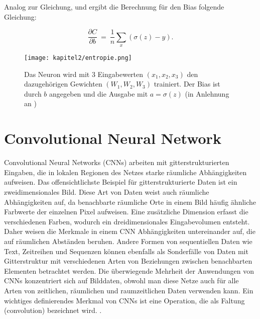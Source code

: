     Analog zur Gleichung\label{Formel2_9}, \label{Formel2_10} und \label{Formel2_11} ergibt die Berechnung für den Bias folgende Gleichung:

    \begin{equation}
        \frac{\partial C}{\partial b} \ =\ \frac{1}{n}\sum _{x}( \sigma ( z) -y).
    \end{equation}

    \begin{figure}[H]
        \centering
        \texttt{[image: kapitel2/entropie.png]}
        \caption[Darstellung der Kreuzentropie am beispiel eines Neurons]{Das Neuron wird mit 3 Eingabewerten $(x_1, x_2, x_3)$ den dazugehörigen Gewichten $(W_1, W_2, W_3)$ trainiert. Der Bias ist durch $b$ angegeben und die Ausgabe mit $a = \sigma(z)$ (in Anlehnung an \cite*{Nielsen2015})}
        \label{Kap2:Entropie}
    \end{figure}

    \section{Convolutional Neural Network}
    Convolutional Neural Networks (CNNs) arbeiten mit gitterstrukturierten Eingaben, die in lokalen Regionen des Netzes starke räumliche Abhängigkeiten aufweisen. Das offensichtlichste Beispiel für gitterstrukturierte Daten ist ein zweidimensionales Bild. Diese Art von Daten weist auch räumliche Abhängigkeiten auf, da benachbarte räumliche Orte in einem Bild häufig ähnliche Farbwerte der einzelnen Pixel aufweisen. Eine zusätzliche Dimension erfasst die verschiedenen Farben, wodurch ein dreidimensionales Eingabevolumen entsteht. Daher weisen die Merkmale in einem CNN Abhängigkeiten untereinander auf, die auf räumlichen Abständen beruhen. Andere Formen von sequentiellen Daten wie Text, Zeitreihen und Sequenzen können ebenfalls als Sonderfälle von Daten mit Gitterstruktur mit verschiedenen Arten von Beziehungen zwischen benachbarten Elementen betrachtet werden. Die überwiegende Mehrheit der Anwendungen von CNNs konzentriert sich auf Bilddaten, obwohl man diese Netze auch für alle Arten von zeitlichen, räumlichen und raumzeitlichen Daten verwenden kann. Ein wichtiges definierendes Merkmal von CNNs ist eine Operation, die als Faltung (convolution) bezeichnet wird. \cite*[315-316]{Aggarwal2018}.


